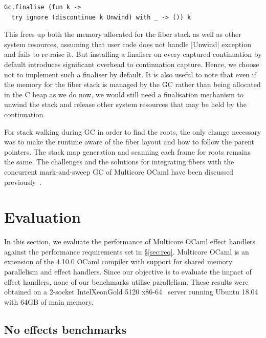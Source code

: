 \documentclass[sigplan,screen]{acmart}
\begin{document}
\begin{lstlisting}
Gc.finalise (fun k ->
  try ignore (discontinue k Unwind) with _ -> ()) k
\end{lstlisting}

This frees up both the memory allocated for the fiber stack as well as other
system resources, assuming that user code does not handle |Unwind| exception
and fails to re-raise it. But installing a finaliser on every captured
continuation by default introduces significant overhead to continuation
capture. Hence, we choose not to implement such a finaliser by default. It is
also useful to note that even if the memory for the fiber stack is managed by
the GC rather than being allocated in the C heap as we do now, we would still
need a finalisation mechanism to unwind the stack and release other system
resources that may be held by the continuation.

For stack walking during GC in order to find the roots, the only change
necessary was to make the runtime aware of the fiber layout and how to follow
the parent pointers. The stack map generation and scanning each frame for roots
remains the same. The challenges and the solutions for integrating fibers with
the concurrent mark-and-sweep GC of Multicore OCaml have been discussed
previously~\cite{Sivaramakrishnan20}.

\section{Evaluation}
\label{sec:eval}

In this section, we evaluate the performance of Multicore OCaml effect handlers
against the performance requirements set in \S\ref{sec:req}. Multicore OCaml is
an extension of the 4.10.0 OCaml compiler with support for shared memory
parallelism and effect handlers. Since our objective is to evaluate the impact
of effect handlers, none of our benchmarks utilise parallelism. These results
were obtained on a 2-socket Intel\textregistered Xeon\textregistered Gold 5120
x86-64~\cite{IntelXeonGold5120Spec} server running Ubuntu 18.04 with 64GB of
main memory.

\subsection{No effects benchmarks}
\end{document}
